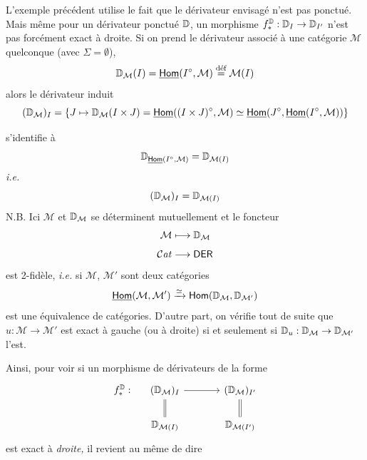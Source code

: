L'exemple précédent utilise le fait que le dérivateur envisagé n'est pas ponctué. Mais même pour un dérivateur ponctué $\mathbb{D}$, un morphisme $f^{\mathbb{D}}_* : \mathbb{D}_I \to \mathbb{D}_{I'}$ n'est pas forcément exact à droite. Si on prend le dérivateur associé à une catégorie $\mathcal{M}$ quelconque (avec $\Sigma = \emptyset$),
\[
\mathbb{D}_{\mathcal{M}}(I) = \underline{\mathsf{Hom}}(I^\circ,\mathcal{M}) \overset{\text{déf}}{=} \mathcal{M}(I)
\]
alors le dérivateur induit
\[
(\mathbb{D}_{\mathcal{M}})_I = \{J \mapsto \mathbb{D}_{\mathcal{M}}(I \times J) = \underline{\mathsf{Hom}}((I \times J)^\circ,\mathcal{M}) \simeq \underline{\mathsf{Hom}}(J^\circ,\underline{\mathsf{Hom}}(I^\circ,\mathcal{M}))\}
\]


s'identifie à
\[
\mathbb{D}_{\underline{\mathsf{Hom}}(I^\circ,\mathcal{M})} = \mathbb{D}_{\mathcal{M}(I)}
\]
\textit{i.e.}
\[
(\mathbb{D}_{\mathcal{M}})_I = \mathbb{D}_{\mathcal{M}(I)}
\]
N.B. Ici $\mathcal{M}$ et $\mathbb{D}_{\mathcal{M}}$ se déterminent mutuellement et le foncteur
\[
\mathcal{M} \longmapsto \mathbb{D}_{\mathcal{M}}
\]
\[
\mathcal{C}\mathit{at} \longrightarrow \mathsf{DER}
\]
est 2-fidèle, \textit{i.e.} si $\mathcal{M}$, $\mathcal{M}'$ sont deux catégories
\[
\underline{\mathsf{Hom}}(\mathcal{M},\mathcal{M}') \xrightarrow{\simeq} \mathsf{Hom}(\mathbb{D}_{\mathcal{M}},\mathbb{D}_{\mathcal{M}'})
\]
est une équivalence de catégories. D'autre part, on vérifie tout de suite que $u : \mathcal{M} \to \mathcal{M}'$ est exact à gauche (ou à droite) si et seulement si $\mathbb{D}_u : \mathbb{D}_{\mathcal{M}} \to \mathbb{D}_{\mathcal{M}'}$ l'est.

Ainsi, pour voir si un morphisme de dérivateurs de la forme
\[
\begin{tikzcd}[column sep=large, row sep=normal]
f^{\D}_* : &[-2.5em] (\D_{\mathcal{M}})_I \arrow[r] \arrow[d, equal] & (\D_{\mathcal{M}})_{I'} \arrow[d, equal] \\
& \D_{\mathcal{M}(I)} & \D_{\mathcal{M}(I')}
\end{tikzcd}
\]
est exact à \textit{droite,} il revient au même de dire

